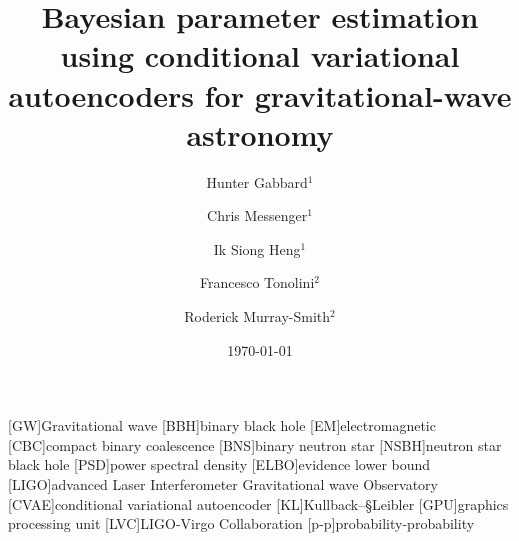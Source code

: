 \documentclass[%
showpacs,
 amsmath,amssymb,
 aps,
 twocolumn,
 prl,
 reprint,
floatfix,
]{revtex4-1}
\begin{document}

\title{Bayesian parameter estimation using conditional variational autoencoders
for gravitational-wave astronomy}

\author{Hunter Gabbard$^1$}
\author{Chris Messenger$^1$}
\author{Ik Siong Heng$^1$}
\author{Francesco Tonolini$^2$}
\author{Roderick Murray-Smith$^2$}


\date{\today}

\maketitle

%

[GW]{Gravitational wave}
[BBH]{binary black hole}
[EM]{electromagnetic}
[CBC]{compact binary coalescence}
[BNS]{binary neutron star}
[NSBH]{neutron star black hole}
[PSD]{power spectral density}
[ELBO]{evidence lower bound}
[LIGO]{advanced Laser Interferometer Gravitational wave Observatory}
[CVAE]{conditional variational autoencoder}
[KL]{Kullback--§Leibler}
[GPU]{graphics processing unit}
[LVC]{LIGO-Virgo Collaboration}
[p-p]{probability-probability}
\end{document}
